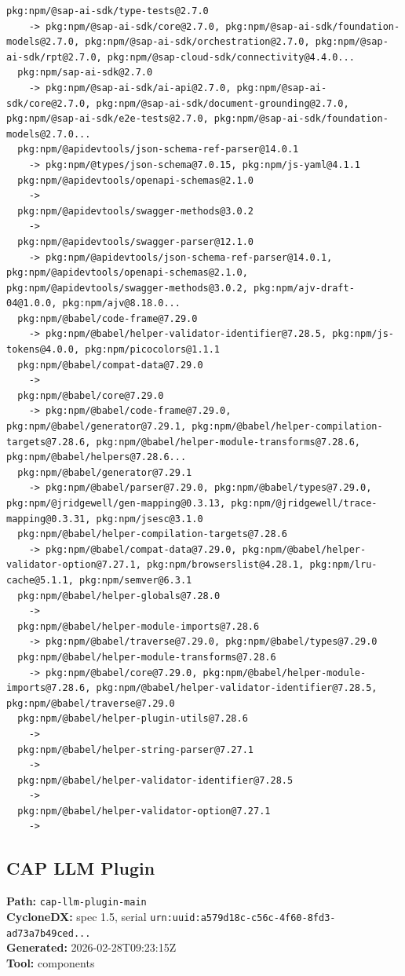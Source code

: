 \documentclass[11pt,a4paper]{article}
\begin{document}
\begin{lstlisting}[style=depgraph]
  pkg:npm/@sap-ai-sdk/type-tests@2.7.0
    -> pkg:npm/@sap-ai-sdk/core@2.7.0, pkg:npm/@sap-ai-sdk/foundation-models@2.7.0, pkg:npm/@sap-ai-sdk/orchestration@2.7.0, pkg:npm/@sap-ai-sdk/rpt@2.7.0, pkg:npm/@sap-cloud-sdk/connectivity@4.4.0...
  pkg:npm/sap-ai-sdk@2.7.0
    -> pkg:npm/@sap-ai-sdk/ai-api@2.7.0, pkg:npm/@sap-ai-sdk/core@2.7.0, pkg:npm/@sap-ai-sdk/document-grounding@2.7.0, pkg:npm/@sap-ai-sdk/e2e-tests@2.7.0, pkg:npm/@sap-ai-sdk/foundation-models@2.7.0...
  pkg:npm/@apidevtools/json-schema-ref-parser@14.0.1
    -> pkg:npm/@types/json-schema@7.0.15, pkg:npm/js-yaml@4.1.1
  pkg:npm/@apidevtools/openapi-schemas@2.1.0
    -> 
  pkg:npm/@apidevtools/swagger-methods@3.0.2
    -> 
  pkg:npm/@apidevtools/swagger-parser@12.1.0
    -> pkg:npm/@apidevtools/json-schema-ref-parser@14.0.1, pkg:npm/@apidevtools/openapi-schemas@2.1.0, pkg:npm/@apidevtools/swagger-methods@3.0.2, pkg:npm/ajv-draft-04@1.0.0, pkg:npm/ajv@8.18.0...
  pkg:npm/@babel/code-frame@7.29.0
    -> pkg:npm/@babel/helper-validator-identifier@7.28.5, pkg:npm/js-tokens@4.0.0, pkg:npm/picocolors@1.1.1
  pkg:npm/@babel/compat-data@7.29.0
    -> 
  pkg:npm/@babel/core@7.29.0
    -> pkg:npm/@babel/code-frame@7.29.0, pkg:npm/@babel/generator@7.29.1, pkg:npm/@babel/helper-compilation-targets@7.28.6, pkg:npm/@babel/helper-module-transforms@7.28.6, pkg:npm/@babel/helpers@7.28.6...
  pkg:npm/@babel/generator@7.29.1
    -> pkg:npm/@babel/parser@7.29.0, pkg:npm/@babel/types@7.29.0, pkg:npm/@jridgewell/gen-mapping@0.3.13, pkg:npm/@jridgewell/trace-mapping@0.3.31, pkg:npm/jsesc@3.1.0
  pkg:npm/@babel/helper-compilation-targets@7.28.6
    -> pkg:npm/@babel/compat-data@7.29.0, pkg:npm/@babel/helper-validator-option@7.27.1, pkg:npm/browserslist@4.28.1, pkg:npm/lru-cache@5.1.1, pkg:npm/semver@6.3.1
  pkg:npm/@babel/helper-globals@7.28.0
    -> 
  pkg:npm/@babel/helper-module-imports@7.28.6
    -> pkg:npm/@babel/traverse@7.29.0, pkg:npm/@babel/types@7.29.0
  pkg:npm/@babel/helper-module-transforms@7.28.6
    -> pkg:npm/@babel/core@7.29.0, pkg:npm/@babel/helper-module-imports@7.28.6, pkg:npm/@babel/helper-validator-identifier@7.28.5, pkg:npm/@babel/traverse@7.29.0
  pkg:npm/@babel/helper-plugin-utils@7.28.6
    -> 
  pkg:npm/@babel/helper-string-parser@7.27.1
    -> 
  pkg:npm/@babel/helper-validator-identifier@7.28.5
    -> 
  pkg:npm/@babel/helper-validator-option@7.27.1
    -> 
\end{lstlisting}

\subsection{CAP LLM Plugin}
\textbf{Path:} \texttt{cap-llm-plugin-main}
\\ \textbf{CycloneDX:} spec 1.5, serial \texttt{urn:uuid:a579d18c-c56c-4f60-8fd3-ad73a7b49ced...}
\\ \textbf{Generated:} 2026-02-28T09:23:15Z
\\ \textbf{Tool:} components
\end{document}
